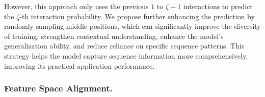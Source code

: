 However, this approach only uses the previous $1$ to $\zeta - 1$ interactions to predict the $\zeta$-th interaction probability. We propose further enhancing the prediction by randomly sampling middle positions, which can significantly improve the diversity of training, strengthen contextual understanding, enhance the model's generalization ability, and reduce reliance on specific sequence patterns. This strategy helps the model capture sequence information more comprehensively, improving its practical application performance.


\vspace{0.1cm}
\subsubsection{Feature Space Alignment.}


